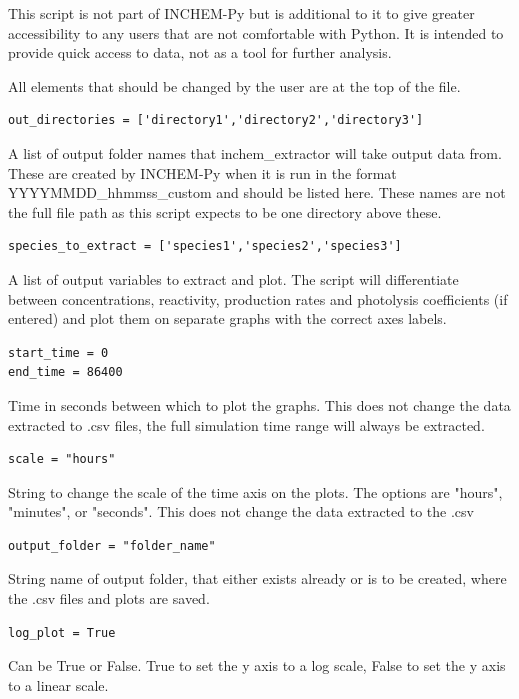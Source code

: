 \documentclass[a4paper]{refart}
\begin{document}
This script is not part of INCHEM-Py but is additional to it to give greater accessibility to any users that are not comfortable with Python. It is intended to provide quick access to data, not as a tool for further analysis.

All elements that should be changed by the user are at the top of the file.

\begin{verbatim}
out_directories = ['directory1','directory2','directory3']
\end{verbatim}
A list of output folder names that inchem\_extractor will take output data from. These are created by INCHEM-Py when it is run in the format YYYYMMDD\_hhmmss\_custom and should be listed here. These names are not the full file path as this script expects to be one directory above these.

\begin{verbatim}
species_to_extract = ['species1','species2','species3']
\end{verbatim}
A list of output variables to extract and plot. The script will differentiate between concentrations, reactivity, production rates and photolysis coefficients (if entered) and plot them on separate graphs with the correct axes labels. 

\begin{verbatim}
start_time = 0
end_time = 86400
\end{verbatim}
Time in seconds between which to plot the graphs. This does not change the data extracted to .csv files, the full simulation time range will always be extracted.

\begin{verbatim}
scale = "hours"
\end{verbatim}
String to change the scale of the time axis on the plots. The options are "hours", "minutes", or "seconds". This does not change the data extracted to the .csv

\begin{verbatim}
output_folder = "folder_name"
\end{verbatim}
String name of output folder, that either exists already or is to be created, where the .csv files and plots are saved.

\begin{verbatim}
log_plot = True
\end{verbatim}
Can be True or False. True to set the y axis to a log scale, False to set the y axis to a linear scale.
\end{document}
